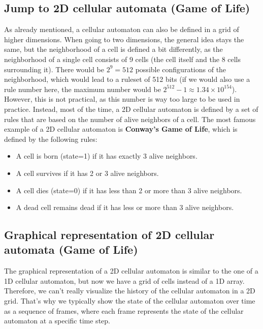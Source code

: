 \documentclass[a4paper,12pt]{llncs}
\numberwithin{equation}{section}
\begin{document}
\subsection{Jump to 2D cellular automata (Game of Life)}
As already mentioned, a cellular automaton can also be defined in a grid of higher dimensions.
When going to two dimensions, the general idea stays the same, but the neighborhood of a cell is defined a bit differently, as the neighborhood of a single cell consists of 9 cells (the cell itself and the 8 cells surrounding it).
There would be $2^9=512$ possible configurations of the neighborhood, which would lead to a ruleset of 512 bits (if we would also use a rule number here, the maximum number would be $2^512 - 1 \approx 1.34 \times 10^{154}$).
However, this is not practical, as this number is way too large to be used in practice.
Instead, most of the time, a 2D cellular automaton is defined by a set of rules that are based on the number of alive neighbors of a cell.
The most famous example of a 2D cellular automaton is \textbf{Conway's Game of Life}, which is defined by the following rules:
\begin{itemize}
  \item A cell is born (state=1) if it has exactly 3 alive neighbors.
  \item A cell survives if it has 2 or 3 alive neighbors.
  \item A cell dies (state=0) if it has less than 2 or more than 3 alive neighbors.
  \item A dead cell remains dead if it has less or more than 3 alive neighbors.
\end{itemize}
\subsection{Graphical representation of 2D cellular automata (Game of Life)}
\label{sec:cellular-automata-graphical-2d}
The graphical representation of a 2D cellular automaton is similar to the one of a 1D cellular automaton, but now we have a grid of cells instead of a 1D array.
Therefore, we can't really visualize the history of the cellular automaton in a 2D grid.
That's why we typically show the state of the cellular automaton over time as a sequence of frames, where each frame represents the state of the cellular automaton at a specific time step.
\end{document}
